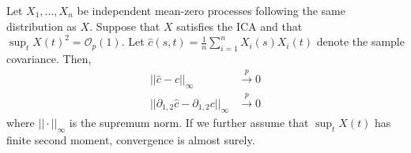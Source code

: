 \begin{theorem}\label{thm:uniform-convergence-kernel}
    Let $X_1, \dots, X_n$ be independent mean-zero processes following the same
    distribution as $X$. Suppose that $X$ satisfies the ICA and that $\sup_t X(t)^2 =
    \mathcal{O}_p(1)$. Let $\hat{c}(s, t) = \frac{1}{n} \sum_{i = 1}^n X_i(s)
    X_i(t)$ denote the sample covariance. Then,
    \begin{align}
        || \hat{c} - c ||_\infty &\overset{p}{\to} 0 \\
        || \partial_{1, 2}\hat{c} - \partial_{1, 2}c ||_\infty &\overset{p}{\to} 0
    \end{align}
    where $|| \cdot ||_\infty$ is the supremum norm. If we further assume that $\sup_t
    X(t)$ has finite second moment, convergence is almost surely.
\end{theorem}
